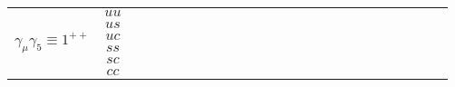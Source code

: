 \documentclass[10pt]{article}
\newcommand{\loq}{{\color[HTML]{006600}{ll}}}
\newcommand{\lon}{{\color[HTML]{800080}{ll}}}
\newcommand{\smq}{{\color[HTML]{006600}{ss}}}
\newcommand{\smn}{{\color[HTML]{800080}{ss}}}
\newcommand{\rcell}{\cellcolor[HTML]{F7CB4A}}
\newcommand{\ocell}{\cellcolor[HTML]{FBAFB5}}
\newcommand{\gcell}{\cellcolor[HTML]{92D2D6}}
\begin{document}
\begin{table}[H]
\begin{adjustbox}{max width=\textwidth}
\begin{tabular}{@{}cc|cc|cc|cc|cc|cc|cc|cc|cc|cc|cc|cc@{}}
        \multirow{6}{*}{$\gamma_\mu\gamma_5 \equiv 1^{++}$} 
        & $uu$ 
        & \ocell\loq&\ocell\smq %
        & \gcell\loq&\gcell\smq %
        & \gcell\loq&\gcell\smn %
        & \gcell\lon&\gcell\smn %
        & \gcell\lon&\gcell\smn %
        & \gcell\lon&\gcell\smn %
        & \ocell\lon&\gcell\smn %
        & \ocell\lon&\gcell\smn %
        & \ocell\lon&\gcell\smn %
        & \rcell\lon&\gcell\smn %
        & \rcell\lon&\gcell\smn %
        \\ 
        & $us$ 
        & \ocell\loq&\ocell\smn %
        & \gcell\loq&\gcell\smn %
        & \gcell\loq&\gcell\smn %
        & \gcell\loq&\gcell\smn %
        & \gcell\lon&\gcell\smn %
        & \gcell\lon&\gcell\smn %
        & \gcell\lon&\gcell\smn %
        & \ocell\lon&\gcell\smn %
        & \ocell\lon&\gcell\smn %
        & \rcell\lon&\gcell\smn %
        & \rcell\lon&\gcell\smn %
        \\ 
        & $uc$ 
        & \ocell\loq&\ocell\smn %
        & \gcell\loq&\gcell\smn %
        & \gcell\lon&\gcell\smn %
        & \gcell\lon&\gcell\smn %
        & \gcell\lon&\gcell\smn %
        & \ocell\lon&\gcell\smn %
        & \ocell\lon&\gcell\smn %
        & \ocell\lon&\gcell\smn %
        & \rcell\lon&\gcell\smn %
        & \rcell\lon&\ocell\smn %
        & \rcell\lon&\ocell\smn %
        \\ 
        & $ss$ 
        & \ocell\loq&\ocell\smn %
        & \gcell\loq&\gcell\smn %
        & \gcell\lon&\gcell\smn %
        & \gcell\lon&\gcell\smn %
        & \gcell\lon&\gcell\smn %
        & \ocell\lon&\gcell\smn %
        & \rcell\lon&\gcell\smn %
        & \ocell\lon&\gcell\smn %
        & \ocell\lon&\gcell\smn %
        & \rcell\lon&\gcell\smn %
        & \rcell\lon&\gcell\smn %
        \\ 
        & $sc$ 
        & \ocell\loq&\ocell\smn %
        & \gcell\lon&\gcell\smn %
        & \gcell\lon&\ocell\smn %
        & \gcell\lon&\ocell\smn %
        & \ocell\lon&\ocell\smn %
        & \ocell\lon&\ocell\smn %
        & \ocell\lon&\ocell\smn %
        & \ocell\lon&\ocell\smn %
        & \rcell\lon&\ocell\smn %
        & \rcell\lon&\ocell\smn %
        & \rcell\lon&\ocell\smn %
        \\ 
        & $cc$ 
        & \ocell\loq&\ocell\smn %
        & \gcell\lon&\ocell\smn %
        & \gcell\lon&\ocell\smn %
        & \ocell\lon&\ocell\smn %

\end{tabular}
\end{adjustbox}
\end{table}
\end{document}
